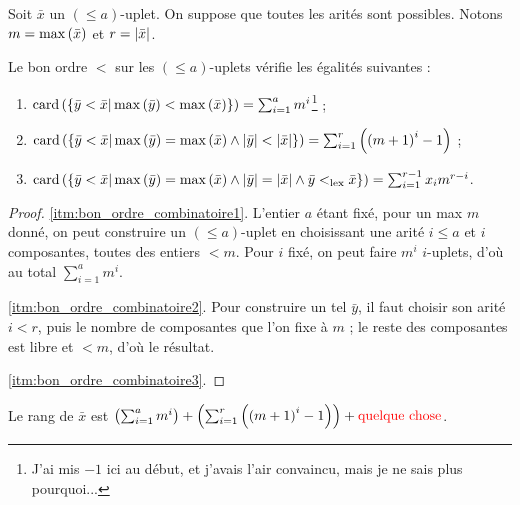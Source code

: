 \documentclass{report}
\newcommand{\leqa}{\left( \leqslant a \right)}
\begin{document}
		\begin{prop}
			\label{prop:bon_ordre_combinatoire}
			Soit $\bar{x}$ un $\leqa$-uplet. On suppose que toutes les arités sont possibles. Notons $m = \max\left( \bar{x} \right)$ et $r = \left|\bar{x}\right|$.
			
			Le bon ordre $<$ sur les $\leqa$-uplets vérifie les égalités suivantes :
			
			\begin{enumerate}
				\item 	\label{itm:bon_ordre_combinatoire1} $\text{card}\left( \left\lbrace \bar{y} < \bar{x} | \max\left( \bar{y} \right) < \max\left( \bar{x} \right) \right\rbrace \right) = \sum_{i=1}^{a} m^i$\footnote{J'ai mis $-1$ ici au début, et j'avais l'air convaincu, mais je ne sais plus pourquoi...} ;
				\item 	\label{itm:bon_ordre_combinatoire2} $\text{card}\left( \left\lbrace \bar{y} < \bar{x} | \max\left( \bar{y} \right) = \max\left( \bar{x} \right) \wedge \left|\bar{y}\right| < \left|\bar{x}\right|  \right\rbrace \right) = \sum_{i=1}^{r} \left( \left(m+1\right)^i -1 \right)$ ; 
				\item 	\label{itm:bon_ordre_combinatoire3} $\text{card}\left( \left\lbrace \bar{y} < \bar{x} | \max\left( \bar{y} \right) = \max\left( \bar{x} \right) \wedge \left|\bar{y}\right| = \left|\bar{x}\right| \wedge \bar{y} <_{\text{lex}} \bar{x}  \right\rbrace \right) = \sum_{i=1}^{r-1} x_i m^{r-i}$. 
			\end{enumerate}
		\end{prop}
		
		\begin{proof}
			\ref{itm:bon_ordre_combinatoire1}. L'entier $a$ étant fixé, pour un max $m$ donné, on peut construire un $\leqa$-uplet en choisissant une arité $i \leqslant a$ et $i$ composantes, toutes des entiers $< m$. Pour $i$ fixé, on peut faire $m^{i}$ $i$-uplets, d'où au total $\sum_{i=1}^{a} m^i$.
			
			\ref{itm:bon_ordre_combinatoire2}. Pour construire un tel $\bar{y}$, il faut choisir son arité $i<r$, puis le nombre de composantes que l'on fixe à $m$ ; le reste des composantes est libre et $<m$, d'où le résultat.
			
			\ref{itm:bon_ordre_combinatoire3}. 
		\end{proof}
		
		\begin{coro}
			\label{coro:rang_bon_ordre}
			Le rang de $\bar{x}$ est $\left( \sum_{i=1}^{a} m^i \right) + \left( \sum_{i=1}^{r} \left( \left(m+1\right)^i -1 \right) \right) + \text{\textcolor{red}{quelque chose}}$.
		\end{coro}
		
\end{document}
